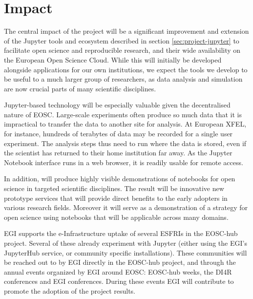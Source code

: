 

\section{Impact}
\label{sec:impact}

The central impact of the \TheProject project will be a significant improvement
and extension of the Jupyter tools and ecosystem described in section \ref{sec:project-jupyter}
to facilitate open science and reproducible research,
and their wide availability on the European Open Science Cloud.
While this will initially be developed alongside applications for our
own institutions, we expect the tools we develop to be useful to a much larger
group of researchers, as data analysis and simulation are now crucial parts
of many scientific disciplines.

Jupyter-based technology will be especially valuable given the decentralised
nature of EOSC. Large-scale experiments often produce so much data that it is
impractical to transfer the data to another site for analysis.
At European XFEL, for instance, hundreds of terabytes of data may be recorded
for a single user experiment. The analysis steps thus need to run where the
data is stored, even if the scientist has returned to their home institution
far away. As the Jupyter Notebook interface runs in a web browser,
it is readily usable for remote access.

In addition, \TheProject will produce highly visible demonstrations of
notebooks for open science in targeted scientific disciplines.
The result will be innovative new prototype services that will provide
direct benefits to the early adopters in various research fields.
Moreover it will serve as a demonstration of a strategy for open science
using notebooks that will be applicable across many domains.

EGI supports the e-Infrastructure uptake of several ESFRIs in the EOSC-hub project.
Several of these already experiment with Jupyter (either using the EGI's JupyterHub
service, or community specific installations). These communities will
be reached out to by
EGI directly in the EOSC-hub project, and through the annual events organized by EGI
around EOSC: EOSC-hub weeks, the DI4R conferences and EGI conferences. During these
events EGI will contribute to promote the adoption of the project results.

